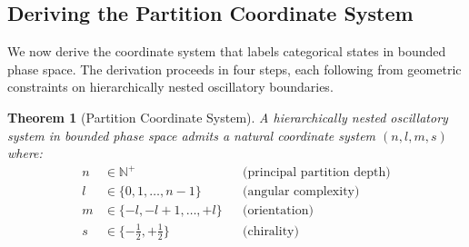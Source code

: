 \documentclass[11pt,twocolumn,a4paper]{article}
\newtheorem{theorem}{Theorem}[section]
\theoremstyle{definition}
\theoremstyle{remark}
\newcommand{\Natural}{\mathbb{N}}
\begin{document}
\subsection{Deriving the Partition Coordinate System}

We now derive the coordinate system that labels categorical states in bounded phase space. The derivation proceeds in four steps, each following from geometric constraints on hierarchically nested oscillatory boundaries.

\begin{theorem}[Partition Coordinate System]
\label{thm:coordinates}
A hierarchically nested oscillatory system in bounded phase space admits a natural coordinate system $(n, l, m, s)$ where:
\begin{align}
n &\in \Natural^+ && \text{(principal partition depth)} \label{eq:n} \\
l &\in \{0, 1, \ldots, n-1\} && \text{(angular complexity)} \label{eq:l} \\
m &\in \{-l, -l+1, \ldots, +l\} && \text{(orientation)} \label{eq:m} \\
s &\in \{-\tfrac{1}{2}, +\tfrac{1}{2}\} && \text{(chirality)} \label{eq:s}
\end{align}
\end{theorem}
\end{document}

